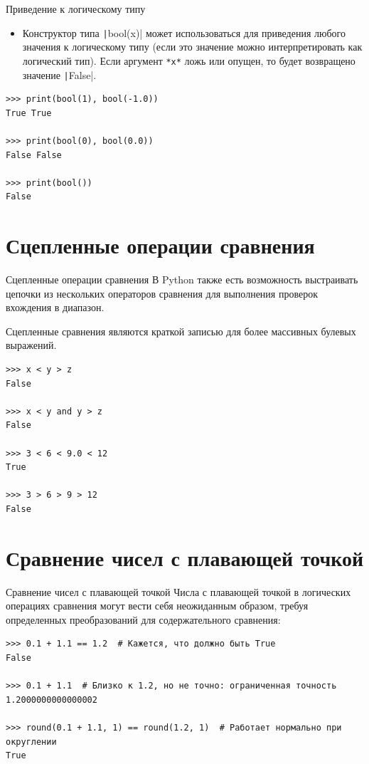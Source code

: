 \documentclass[aspectratio=169, mathserif]{beamer}	%
\begin{document}
\begin{frame}[fragile]{Приведение к логическому типу}
\scriptsize
\begin{itemize}
	\item Конструктор типа \texttt|bool(x)| может использоваться для приведения любого значения к логическому типу (если это значение можно интерпретировать как логический тип). Если аргумент \texttt{*x*} ложь или опущен, то будет возвращено значение \texttt|False|.
\end{itemize}

\begin{verbatim}
>>> print(bool(1), bool(-1.0))
True True

>>> print(bool(0), bool(0.0))
False False

>>> print(bool())
False
\end{verbatim}
\vfill
\end{frame}

\section{Сцепленные операции сравнения}
\sectionframe


\begin{frame}[fragile]{Сцепленные операции сравнения}
\scriptsize
В Python также есть возможность выстраивать цепочки из нескольких операторов сравнения для выполнения проверок вхождения в диапазон. 

Сцепленные сравнения являются краткой записью для более массивных булевых выражений.

\begin{verbatim}
>>> x < y > z
False

>>> x < y and y > z
False

>>> 3 < 6 < 9.0 < 12
True

>>> 3 > 6 > 9 > 12
False
\end{verbatim}
\vfill
\end{frame}


\section{Сравнение чисел с плавающей точкой}
\sectionframe


\begin{frame}[fragile]{Сравнение чисел с плавающей точкой}
\scriptsize
Числа с плавающей точкой в логических операциях сравнения могут вести себя неожиданным образом, требуя определенных преобразований для содержательного сравнения:

\begin{verbatim}
>>> 0.1 + 1.1 == 1.2  # Кажется, что должно быть True 
False

>>> 0.1 + 1.1  # Близко к 1.2, но не точно: ограниченная точность
1.2000000000000002

>>> round(0.1 + 1.1, 1) == round(1.2, 1)  # Работает нормально при округлении
True
\end{verbatim}
\vfill
\end{frame}
\end{document}
